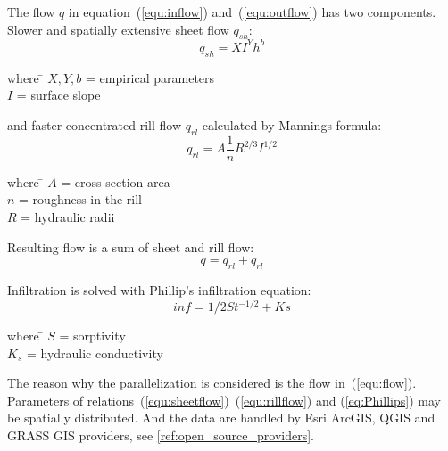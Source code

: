 The flow $q$ in equation~(\ref{equ:inflow}) and~(\ref{equ:outflow})
has two components. Slower and spatially extensive sheet flow
$q_{sh}$:
\begin{equation}\label{equ:sheetflow}
    q_{sh} = XI^Yh^b
\end{equation}
\begin{tabbing} 
where \hspace{0.6cm} \= $X,Y,b$ = empirical parameters\\
\> $I$ = surface slope
\end{tabbing}
and faster concentrated rill flow $q_{rl}$ calculated by Mannings formula:
\begin{equation}\label{equ:rillflow}
    q_{rl} = A\frac{1}{n} R^{2/3} I^{1/2}
\end{equation}
\begin{tabbing} 
where \hspace{0.6cm} \= $A$ = cross-section area\\
\> $n$ = roughness in the rill\\
\> $R$ = hydraulic radii
\end{tabbing}
Resulting flow is a sum of sheet and rill flow:
\begin{equation}\label{equ:flow}
    q = q_{rl} + q_{rl}
\end{equation}

Infiltration is solved with Phillip's infiltration equation:
\begin{equation}\label{eq:Phillips}
    inf = 1/2St^{-1/2} + Ks
\end{equation}
\begin{tabbing} 
where \hspace{0.6cm} \= $S$ = sorptivity\\
\> $K_s$ = hydraulic conductivity
\end{tabbing}

The reason why the parallelization is considered is the flow
in~(\ref{equ:flow}). Parameters of
relations~(\ref{equ:sheetflow})~(\ref{equ:rillflow}) and
(\ref{eq:Phillips}) may be spatially distributed. And the data are
handled by Esri ArcGIS, QGIS and GRASS GIS providers, see
\ref{ref:open_source_providers}.
